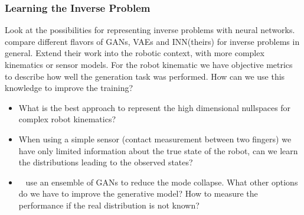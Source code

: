 \documentclass[a4paper]{article}
\begin{document}



\subsubsection{Learning the Inverse Problem}
Look at the possibilities for representing inverse problems with neural networks.
~\citet{Ardizzone2018inverse} compare different flavors of GANs, VAEs and INN(theirs) for inverse problems in general.
Extend their work into the robotic context, with more complex kinematics or sensor models.
For the robot kinematic we have objective metrics to describe how well the generation task was performed.
How can we use this knowledge to improve the training?
\begin{itemize}
  \item What is the best approach to represent the high dimensional nullspaces for complex robot kinematics?
  \item When using a simple sensor (contact measurement between two fingers) we have only limited information about the true state of the robot, can we learn the distributions leading to the observed states? 
  \item ~\citet{Lembono2021GAN} use an ensemble of GANs to reduce the mode collapse.
        What other options do we have to improve the generative model? 
        How to measure the performance if the real distribution is not known?

\end{itemize}
\end{document}
